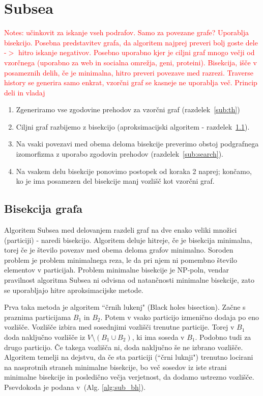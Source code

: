 \documentclass[a4paper, 12pt, ]{book}
\newcommand{\TODO}[1]{\textcolor{red}{#1}}
\newcommand{\refalg}[1]{(Alg. \ref{#1})}
\begin{document}
\chapter{Subsea}
	\TODO{Notes: učinkovit za iskanje vseh podrafov. Samo za povezane grafe? Uporablja bisekcijo. Posebna predstavitev grafa, da algoritem najprej 
	preveri bolj goste dele -$>$ hitro iskanje negativov. Posebno uporabno kjer je ciljni graf mnogo večji od vzorčnega (uporabno za web in socialna omrežja,
	geni,	proteini).	
	Bisekcija, išče v posameznih delih, če je minimalna, hitro preveri povezave med razrezi. Traverse history se generira samo enkrat, vzorčni graf se
	kasneje ne uporablja več.
	Princip deli in vladaj}

	\begin{enumerate}
		\item Zgeneriramo vse zgodovine prehodov za vzorčni graf (razdelek~\ref{sub:th})
		\item Ciljni graf razbijemo z bisekcijo (aproksimacijski algoritem - razdelek~\ref{sub:bisect}).
		\item Na vsaki povezavi med obema deloma bisekcije preverimo obstoj podgrafnega izomorfizma z uporabo zgodovin prehodov 
			(razdelek~\ref{sub:search}).
		\item Na vsakem delu bisekcije ponovimo postopek od koraka 2 naprej; končamo, ko je ima posamezen del bisekcije manj vozlišč kot vzorčni graf.
	\end{enumerate}

	\section{Bisekcija grafa}
	\label{sub:bisect}
	Algoritem Subsea med delovanjem razdeli graf na dve enako veliki množici (particiji) - naredi bisekcijo. Algoritem deluje hitreje, če je bisekcija 
	minimalna, torej če je število povezav med obema deloma grafov minimalno. Soroden problem je problem minimalnega reza, le da pri njem ni 
	pomembno število elementov v particijah. Problem minimalne bisekcije je NP-poln, vendar pravilnost algoritma Subsea ni odvisna od natančnosti
	minimalne bisekcije, zato se uporabljajo hitre aproksimacijske metode.

	Prva taka metoda je  algoritem ``črnih lukenj" (Black holes bisection). Začne s praznima particijama $B_1$ in $B_2$. Potem v vsako particijo izmenično
	dodaja po eno vozlišče.
	Vozlišče izbira med sosednjimi vozlišči trenutne particije. Torej v $B_1$ doda naključno vozlišče iz $V \setminus (B_1 \cup B_2)$, ki ima soseda v $B_1$.
	Podobno tudi za drugo particijo. Če takega vozlišča ni, doda naključno še ne izbrano vozlišče. Algoritem temelji na dejstvu, da če sta particiji (``črni 
	luknji") trenutno locirani na 	nasprotnih straneh minimalne bisekcije, bo več sosedov iz iste strani minimalne bisekcije in posledično večja verjetnost, da
	dodamo ustrezno vozlišče. Psevdokoda je podana v~\refalg{alg:sub_bh}.
\end{document}

